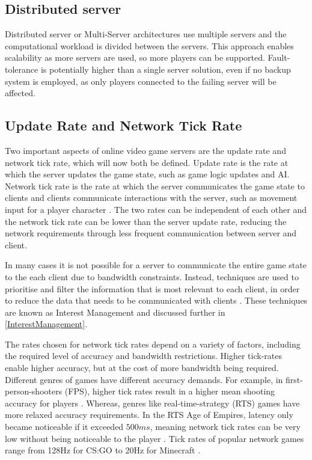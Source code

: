 \subsection{Distributed server}
Distributed server or Multi-Server architectures use multiple servers and the computational workload is divided between the servers. This approach enables scalability as more servers are used, so more players can be supported. Fault-tolerance is potentially higher than a single server solution, even if no backup system is employed, as only players connected to the failing server will be affected.


\subsection{Update Rate and Network Tick Rate} \label{update-rate-test-values}

Two important aspects of online video game servers are the update rate and network tick rate, which will now both be defined. Update rate is the rate at which the server updates the game state, such as game logic updates and AI. Network tick rate is the rate at which the server communicates the game state to clients and clients communicate interactions with the server, such as movement input for a player character \cite{pisan2004challenges}. The two rates can be independent of each other and the network tick rate can be lower than the server update rate, reducing the network requirements through less frequent communication between server and client.

In many cases it is not possible for a server to communicate the entire game state to the each client due to bandwidth constraints. Instead, techniques are used to prioritise and filter the information that is most relevant to each client, in order to reduce the data that needs to be communicated with clients \cite{pisan2004challenges}. These techniques are known as Interest Management and discussed further in \ref{InterestManagement}.

The rates chosen for network tick rates depend on a variety of factors, including the required level of accuracy and bandwidth restrictions. Higher tick-rates enable higher accuracy, but at the cost of more bandwidth being required. Different genres of games have different accuracy demands. For example, in first-person-shooters (FPS), higher tick rates result in a higher mean shooting accuracy for players \cite{lee2015evaluation}. Whereas, genres like real-time-strategy (RTS) games have more relaxed accuracy requirements. In the RTS Age of Empires, latency only became noticeable if it exceeded $500ms$, meaning network tick rates can be very low without being noticeable to the player \cite{pisan2004challenges}. Tick rates of popular network games range from 128Hz for CS:GO to 20Hz for Minecraft \cite{metzger2016comprehensive}.

